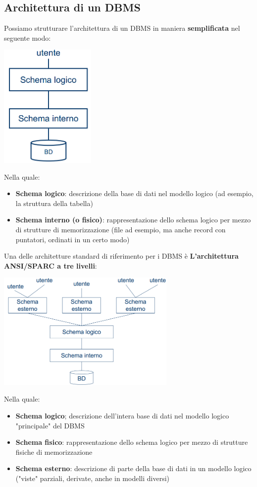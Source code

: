\documentclass[12pt]{article}
\begin{document}
\subsection{Architettura di un DBMS}
Possiamo strutturare l'architettura di un DBMS in maniera \textbf{semplificata} nel seguente modo:
\begin{center}
    \includegraphics[width = 0.35\textwidth]{Images/7.PNG}
\end{center}
Nella quale:
\begin{itemize}
    \item \textbf{Schema logico}: descrizione della base di dati nel modello logico (ad esempio, la struttura della tabella)
    \item \textbf{Schema interno (o fisico)}: rappresentazione dello schema logico per mezzo di strutture di memorizzazione (file ad esempio, ma anche record con puntatori, ordinati in un certo modo)
\end{itemize}
Una delle architetture standard di riferimento per i DBMS è \textbf{L'architettura \newline ANSI/SPARC a tre livelli}:
\begin{center}
    \includegraphics[width = 0.65\textwidth]{Images/8.PNG}
\end{center}
Nella quale:
\begin{itemize}
    \item \textbf{Schema logico}; descrizione dell'intera base di dati nel modello logico "principale" del DBMS
    \item \textbf{Schema fisico}: rappresentazione dello schema logico per mezzo di strutture fisiche di memorizzazione
    \item \textbf{Schema esterno}: descrizione di parte della base di dati in un modello logico ("viste" parziali, derivate, anche in modelli diversi)
\end{itemize}
\end{document}
